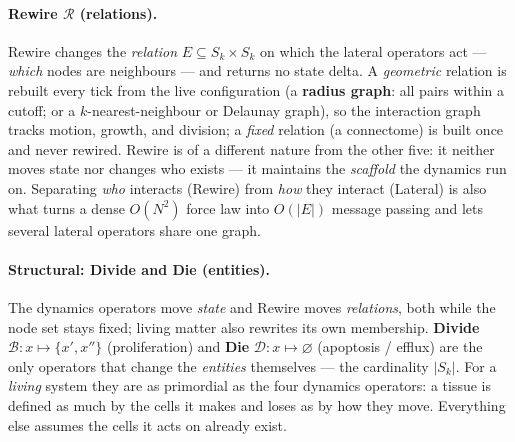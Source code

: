 \documentclass[11pt]{article}
\begin{document}
\paragraph{Rewire $\mathcal{R}$ (relations).} Rewire changes the \emph{relation}
$E\subseteq S_k\times S_k$ on which the lateral operators act --- \emph{which}
nodes are neighbours --- and returns no state delta. A \emph{geometric} relation is
rebuilt every tick from the live configuration (a \textbf{radius graph}: all pairs
within a cutoff; or a $k$-nearest-neighbour or Delaunay graph), so the interaction
graph tracks motion, growth, and division; a \emph{fixed} relation (a connectome)
is built once and never rewired. Rewire is of a different nature from the other
five: it neither moves state nor changes who exists --- it maintains the
\emph{scaffold} the dynamics run on. Separating \emph{who} interacts (Rewire) from
\emph{how} they interact (Lateral) is also what turns a dense $O(N^2)$ force law
into $O(|E|)$ message passing and lets several lateral operators share one graph.

\paragraph{Structural: Divide and Die (entities).} The dynamics operators move \emph{state}
and Rewire moves \emph{relations}, both while the node set stays fixed; living
matter also rewrites its own membership. \textbf{Divide}
$\mathcal{B}: x \mapsto \{x',x''\}$ (proliferation) and \textbf{Die}
$\mathcal{D}: x \mapsto \varnothing$ (apoptosis / efflux) are the only operators
that change the \emph{entities} themselves --- the cardinality $|S_k|$. For a
\emph{living} system they are as primordial as the four dynamics operators: a
tissue is defined as much by the cells it makes and loses as by how they move.
Everything else assumes the cells it acts on already exist.
\end{document}
